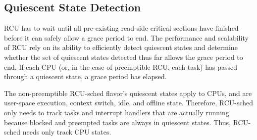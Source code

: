 \subsection{Quiescent State Detection} \label{sec:quiescent_state}
RCU has to wait until all pre-existing read-side critical sections have
finished before it can safely allow a grace period to end.
The performance and scalability of RCU rely on its ability to efficiently
detect quiescent states and determine whether the set of quiescent states
detected thus far allows the grace period to end.
If each CPU (or, in the case of preemptible RCU, each task)
has passed through a quiescent state, a grace period has elapsed. 

The non-preemptible RCU-sched flavor's quiescent states
apply to CPUs, and are user-space execution, context switch, idle, and 
offline state.
%
%
Therefore, RCU-sched %
only needs to track tasks and interrupt handlers that are actually running because
blocked and preempted tasks are always in quiescent states. Thus, RCU-sched %
needs only track CPU states.

